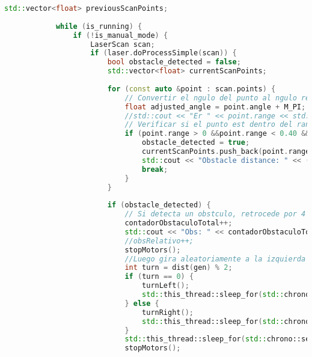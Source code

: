 \begin{lstlisting}[language={C++}, caption={Primer ajuste de c\'odigo}, label={Script}]
            std::vector<float> previousScanPoints;
        
            while (is_running) {
                if (!is_manual_mode) {
                    LaserScan scan;
                    if (laser.doProcessSimple(scan)) {
                        bool obstacle_detected = false;
                        std::vector<float> currentScanPoints;
                        
                        for (const auto &point : scan.points) {
                            // Convertir el ngulo del punto al ngulo relativo al "sur" del robot
                            float adjusted_angle = point.angle + M_PI;
                            //std::cout << "Er " << point.range << std::endl;
                            // Verificar si el punto est dentro del rango frontal de 30
                            if (point.range > 0 &&point.range < 0.40 && abs(point.angle) < adjusted_angle) {
                                obstacle_detected = true;
                                currentScanPoints.push_back(point.range);
                                std::cout << "Obstacle distance: " << (float)point.range  << " Y en el angulo  "<<point.angle << std::endl;
                                break;
                            }
                        }
                        
                        if (obstacle_detected) {
                            // Si detecta un obstculo, retrocede por 4 segundos
                            contadorObstaculoTotal++;
                            std::cout << "Obs: " << contadorObstaculoTotal << std::endl;
                            //obsRelativo++;
                            stopMotors();
                            //Luego gira aleatoriamente a la izquierda o derecha
                            int turn = dist(gen) % 2;
                            if (turn == 0) {
                                turnLeft();
                                std::this_thread::sleep_for(std::chrono::seconds(5));
                            } else {
                                turnRight();
                                std::this_thread::sleep_for(std::chrono::seconds(5));
                            }
                            std::this_thread::sleep_for(std::chrono::seconds(2));
                            stopMotors();
                            

\end{lstlisting}
